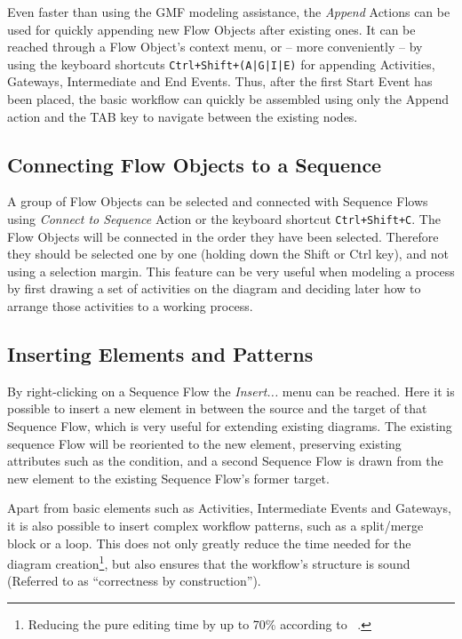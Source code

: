 Even faster than using the GMF modeling assistance, the \emph{Append} Actions can
be used for quickly appending new Flow Objects after existing ones.  It can be
reached through a Flow Object's context menu, or -- more conveniently -- by
using the keyboard shortcuts \texttt{Ctrl+Shift+(A|G|I|E)} for appending Activities,
Gateways, Intermediate and End Events.  Thus, after the first Start Event has
been placed, the basic workflow can quickly be assembled using only the Append
action and the TAB key to navigate between the existing nodes.



\subsection{Connecting Flow Objects to a Sequence}

A group of Flow Objects can be selected and connected with Sequence Flows using
\emph{Connect to Sequence} Action or the keyboard shortcut \texttt{Ctrl+Shift+C}.
The Flow Objects will be connected in the order they have been selected.  Therefore
they should be selected one by one (holding down the Shift or Ctrl key), and not
using a selection margin.  This feature can be very useful when modeling a process
by first drawing a set of activities on the diagram and deciding later how to
arrange those activities to a working process.



\subsection{Inserting Elements and Patterns}

By right-clicking on a Sequence Flow the \emph{Insert...} menu can be reached.
Here it is possible to insert a new element in between the source and the target
of that Sequence Flow, which is very useful for extending existing diagrams.  The
existing sequence Flow will be reoriented to the new element, preserving existing
attributes such as the condition, and a second Sequence Flow is drawn from the
new element to the existing Sequence Flow's former target.

Apart from basic elements such as Activities, Intermediate Events and Gateways,
it is also possible to insert complex workflow patterns, such as a split/merge
block or a loop.  This does not only greatly reduce the time needed for the
diagram creation\footnote{Reducing the pure editing time by up to 70\% according
to ~\cite{gschwind2008applying}.}, but also ensures that the workflow's structure
is sound (Referred to as ``correctness by construction'').

